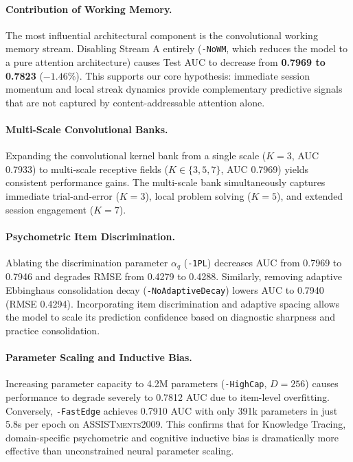 \documentclass[11pt]{article}
\begin{document}
\paragraph{Contribution of Working Memory.}
The most influential architectural component is the convolutional working memory stream. Disabling Stream A entirely (\texttt{-NoWM}, which reduces the model to a pure attention architecture) causes Test AUC to decrease from \textbf{0.7969 to 0.7823} ($-1.46\%$). This supports our core hypothesis: immediate session momentum and local streak dynamics provide complementary predictive signals that are not captured by content-addressable attention alone.

\paragraph{Multi-Scale Convolutional Banks.}
Expanding the convolutional kernel bank from a single scale ($K=3$, AUC 0.7933) to multi-scale receptive fields ($K \in \{3, 5, 7\}$, AUC 0.7969) yields consistent performance gains. The multi-scale bank simultaneously captures immediate trial-and-error ($K=3$), local problem solving ($K=5$), and extended session engagement ($K=7$).

\paragraph{Psychometric Item Discrimination.}
Ablating the discrimination parameter $\alpha_q$ (\texttt{-1PL}) decreases AUC from 0.7969 to 0.7946 and degrades RMSE from 0.4279 to 0.4288. Similarly, removing adaptive Ebbinghaus consolidation decay (\texttt{-NoAdaptiveDecay}) lowers AUC to 0.7940 (RMSE 0.4294). Incorporating item discrimination and adaptive spacing allows the model to scale its prediction confidence based on diagnostic sharpness and practice consolidation.

\paragraph{Parameter Scaling and Inductive Bias.}
Increasing parameter capacity to 4.2M parameters (\texttt{-HighCap}, $D=256$) causes performance to degrade severely to 0.7812 AUC due to item-level overfitting. Conversely, \texttt{-FastEdge} achieves 0.7910 AUC with only 391k parameters in just 5.8s per epoch on \textsc{ASSISTments2009}. This confirms that for Knowledge Tracing, domain-specific psychometric and cognitive inductive bias is dramatically more effective than unconstrained neural parameter scaling.
\end{document}
